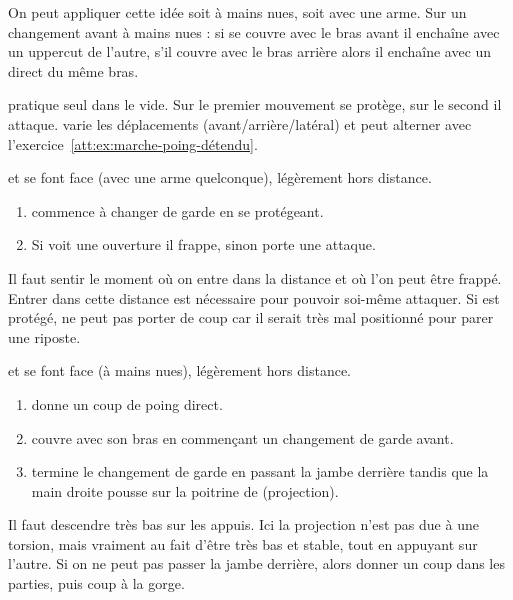 On peut appliquer cette idée soit à mains nues, soit avec une arme.
Sur un changement avant à mains nues : si \A se couvre avec le bras avant il enchaîne avec un uppercut de l'autre, s'il couvre avec le bras arrière alors il enchaîne avec un direct du même bras.


\begin{exercice}
	\label{att:ex:changement-garde-2-temps-vide}

	\A pratique seul dans le vide.
	Sur le premier mouvement \A se protège, sur le second il attaque.
	\A varie les déplacements (avant/arrière/latéral) et peut alterner avec l'exercice~\ref{att:ex:marche-poing-détendu}.
\end{exercice}



\begin{exercice}
	\label{att:ex:changement-garde-2-temps-test}

	\A et \D se font face (avec une arme quelconque), légèrement hors distance.

	\begin{enumerate}
		\item \A commence à changer de garde en se protégeant.
		
		\item Si \D voit une ouverture il frappe, sinon \A porte une attaque.
	\end{enumerate}

	Il faut sentir le moment où on entre dans la distance et où l'on peut être frappé.
	Entrer dans cette distance est nécessaire pour pouvoir soi-même attaquer.
	Si \A est protégé, \D ne peut pas porter de coup car il serait très mal positionné pour parer une riposte.
\end{exercice}


\begin{exercice}
	\label{att:ex:changement-garde-2-temps-projection}

	\A et \D se font face (à mains nues), légèrement hors distance.

	\begin{enumerate}
		\item \A donne un coup de poing direct.
		
		\item \D couvre avec son bras en commençant un changement de garde avant.
		
		\item \D termine le changement de garde en passant la jambe derrière \D tandis que la main droite pousse sur la poitrine de \A (projection).
	\end{enumerate}

	Il faut descendre très bas sur les appuis.
	Ici la projection n'est pas due à une torsion, mais vraiment au fait d'être très bas et stable, tout en appuyant sur l'autre.
	Si on ne peut pas passer la jambe derrière, alors donner un coup dans les parties, puis coup à la gorge.
\end{exercice}


